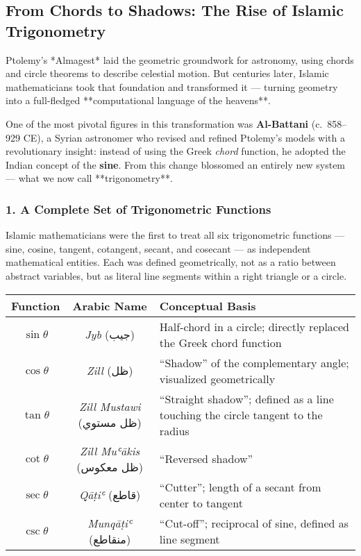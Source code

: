 \subsection{From Chords to Shadows: The Rise of Islamic Trigonometry}

Ptolemy’s *Almagest* laid the geometric groundwork for astronomy, using chords and circle theorems to describe celestial motion. But centuries later, Islamic mathematicians took that foundation and transformed it — turning geometry into a full-fledged **computational language of the heavens**.

One of the most pivotal figures in this transformation was \textbf{Al-Battani} (c.~858–929 CE), a Syrian astronomer who revised and refined Ptolemy’s models with a revolutionary insight: instead of using the Greek \textit{chord} function, he adopted the Indian concept of the \textbf{sine}. From this change blossomed an entirely new system — what we now call **trigonometry**.

\subsubsection*{1. A Complete Set of Trigonometric Functions}

Islamic mathematicians were the first to treat all six trigonometric functions — sine, cosine, tangent, cotangent, secant, and cosecant — as independent mathematical entities. Each was defined geometrically, not as a ratio between abstract variables, but as literal line segments within a right triangle or a circle.

\begin{center}
\renewcommand{\arraystretch}{1.4}
\begin{tabular}{|c|c|p{6cm}|}
\hline
\textbf{Function} & \textbf{Arabic Name} & \textbf{Conceptual Basis} \\
\hline
\( \sin \theta \) & \textit{Jyb} (جيب) & Half-chord in a circle; directly replaced the Greek chord function \\
\( \cos \theta \) & \textit{Zill} (ظل) & “Shadow” of the complementary angle; visualized geometrically \\
\( \tan \theta \) & \textit{Zill Mustawi} (ظل مستوي) & “Straight shadow”; defined as a line touching the circle tangent to the radius \\
\( \cot \theta \) & \textit{Zill Muʿākis} (ظل معكوس) & “Reversed shadow” \\
\( \sec \theta \) & \textit{Qāṭiʿ} (قاطع) & “Cutter”; length of a secant from center to tangent \\
\( \csc \theta \) & \textit{Munqāṭiʿ} (منقاطع) & “Cut-off”; reciprocal of sine, defined as line segment \\
\hline
\end{tabular}
\end{center}


